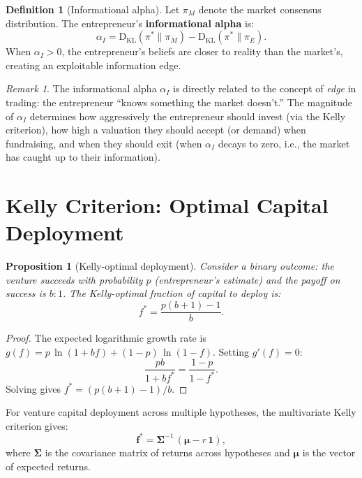 \documentclass[12pt,a4paper,oneside]{book}
\newtheorem{proposition}[theorem]{Proposition}
\theoremstyle{definition}
\newtheorem{definition}[theorem]{Definition}
\theoremstyle{remark}
\newtheorem{remark}[theorem]{Remark}
\newcommand{\KL}{\mathrm{D}_{\mathrm{KL}}}
\begin{document}
\begin{definition}[Informational alpha]\label{def:alpha}
Let $\pi_M$ denote the market consensus distribution. The entrepreneur's
\textbf{informational alpha} is:
\begin{equation}\label{eq:info_alpha}
  \alpha_I = \KL(\pi^* \| \pi_M) - \KL(\pi^* \| \pi_E).
\end{equation}
When $\alpha_I > 0$, the entrepreneur's beliefs are closer to reality than
the market's, creating an exploitable information edge.
\end{definition}

\begin{remark}
The informational alpha $\alpha_I$ is directly related to the concept of
\emph{edge} in trading: the entrepreneur ``knows something the market doesn't.''
The magnitude of $\alpha_I$ determines how aggressively the entrepreneur should
invest (via the Kelly criterion), how high a valuation they should accept (or demand)
when fundraising, and when they should exit (when $\alpha_I$ decays to zero, i.e.,
the market has caught up to their information).
\end{remark}

\section{Kelly Criterion: Optimal Capital Deployment}

\begin{proposition}[Kelly-optimal deployment]\label{prop:kelly}
Consider a binary outcome: the venture succeeds with probability $p$
(entrepreneur's estimate) and the payoff on success is $b : 1$. The
Kelly-optimal fraction of capital to deploy is:
\begin{equation}\label{eq:kelly}
  f^* = \frac{p(b+1) - 1}{b}.
\end{equation}
\end{proposition}

\begin{proof}
The expected logarithmic growth rate is $g(f) = p\,\ln(1+bf) + (1-p)\,\ln(1-f)$.
Setting $g'(f) = 0$:
\[
  \frac{pb}{1+bf^*} = \frac{1-p}{1-f^*}.
\]
Solving gives $f^* = (p(b+1) - 1)/b$.
\end{proof}

For venture capital deployment across multiple hypotheses, the multivariate
Kelly criterion gives:
\begin{equation}\label{eq:kelly_multi}
  \mathbf{f}^* = \boldsymbol{\Sigma}^{-1}\,(\boldsymbol{\mu} - r\,\mathbf{1}),
\end{equation}
where $\boldsymbol{\Sigma}$ is the covariance matrix of returns across
hypotheses and $\boldsymbol{\mu}$ is the vector of expected returns.
\end{document}
